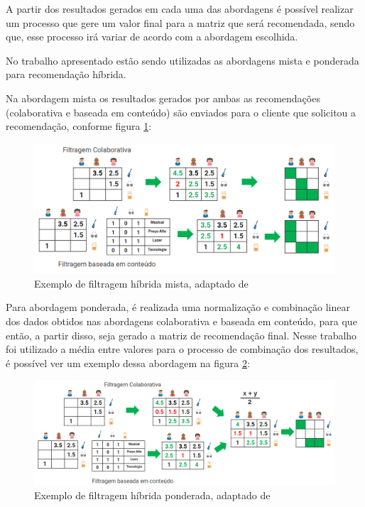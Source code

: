 A partir dos resultados gerados em cada uma das abordagens é possível realizar um processo que gere um valor final para a matriz que será recomendada, sendo que, esse processo irá variar de acordo com a abordagem escolhida. 

No trabalho apresentado estão sendo utilizadas as abordagens mista e ponderada para recomendação híbrida.

Na abordagem mista os resultados gerados por ambas as recomendações (colaborativa e baseada em conteúdo) são enviados para o cliente que solicitou a recomendação, conforme figura \ref{fig:algoritmohibridomisto}:

\begin{figure}[H]
	\centering
	\includegraphics[width=1\linewidth]{imagens/hibridamista.png}
	\caption[Exemplo de filtragem híbrida mista]{Exemplo de filtragem híbrida mista, adaptado de \cite{araujo2011apprecommender}}
    \label{fig:algoritmohibridomisto}
\end{figure}

Para abordagem ponderada, é realizada uma normalização e combinação linear dos dados obtidos nas abordagens colaborativa e baseada em conteúdo, para que então, a partir disso, seja gerado a matriz de recomendação final. Nesse trabalho foi utilizado a média entre valores para o processo de combinação dos resultados, é possível ver um exemplo dessa abordagem na figura \ref{fig:algoritmohibridoponderado}:

\begin{figure}[H]
	\centering
	\includegraphics[width=.8\linewidth]{imagens/hibridaponderada.png}
	\caption[Exemplo de filtragem híbrida ponderada]{Exemplo de filtragem híbrida ponderada, adaptado de \cite{araujo2011apprecommender}}
    \label{fig:algoritmohibridoponderado}
\end{figure}

